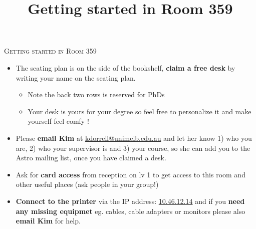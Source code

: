 \documentclass[11pt, oneside, a4paper]{article}
\title{Getting started in Room 359}
\begin{document}
\pagestyle{fancy}
\thispagestyle{firstpage}                                      
{\centering \LARGE \textsc{Getting started in Room 359} \\}
\vspace{0.1em}

\Large
 
\begin{tcolorbox}[colback=red!5!white,colframe=red!50!white,title={Essentials!}]
    \begin{itemize}
        \item The seating plan is on the side of the bookshelf, \textbf{claim a free desk} by writing your name on the seating plan.
        \begin{itemize}
            \item Note the back two rows is reserved for PhDs
            \item Your desk is yours for your degree so feel free to personalize it and make yourself feel comfy !
        \end{itemize}
        \item Please \textbf{email Kim} at \url{kdorrell@unimelb.edu.au} and let her know 1) who you are, 2) who your supervisor is and 3) your course, so she can add you to the Astro mailing list, once you have claimed a desk.
        \item Ask for \textbf{ card access} from reception on lv 1 to get access to this room and other useful places (ask people in your group!)
        \item \textbf{Connect to the printer} via the IP address: \url{10.46.12.14} and if you \textbf{need any missing equipmet} eg. cables, cable adapters or monitors please also \textbf{email Kim} for help.
    \end{itemize}
\end{tcolorbox}
\end{document}
